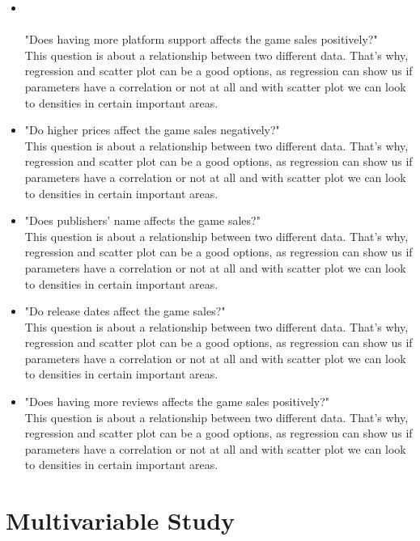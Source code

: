 \documentclass[conference]{IEEEtran}
\begin{document}
\begin{itemize}
    \item \\\\"Does having more platform support affects the game sales positively?" \\ This question is about a relationship between two different data. That's why, regression and scatter plot can be a good options, as regression can show us if parameters have a correlation or not at all and with scatter plot we can look to densities in certain important areas.\\
    \item "Do higher prices affect the game sales negatively?" \\ This question is about a relationship between two different data. That's why, regression and scatter plot can be a good options, as regression can show us if parameters have a correlation or not at all and with scatter plot we can look to densities in certain important areas.\\
    \item "Does publishers' name affects the game sales?" \\ This question is about a relationship between two different data. That's why, regression and scatter plot can be a good options, as regression can show us if parameters have a correlation or not at all and with scatter plot we can look to densities in certain important areas.\\
    \item "Do release dates affect the game sales?" \\ This question is about a relationship between two different data. That's why, regression and scatter plot can be a good options, as regression can show us if parameters have a correlation or not at all and with scatter plot we can look to densities in certain important areas.\\
    \item "Does having more reviews affects the game sales positively?" \\ This question is about a relationship between two different data. That's why, regression and scatter plot can be a good options, as regression can show us if parameters have a correlation or not at all and with scatter plot we can look to densities in certain important areas.\\
\end{itemize}


\section{Multivariable Study}
\end{document}
